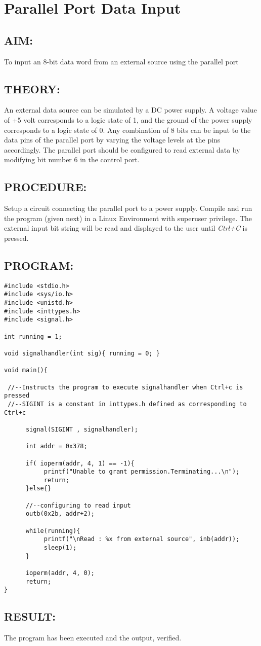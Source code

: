 
\chapter{Parallel Port Data Input}
%
%
\section*{AIM:}
To input an 8-bit data word from an external source using the parallel port
\section*{THEORY:}
An external data source can be simulated by a DC power supply. A voltage value of +5 volt corresponds to a logic state of 1, and the ground of the power supply corresponds to a logic state of 0. Any combination of 8
bits can be input to the data pins of the parallel port by varying the voltage levels at the pins accordingly. The parallel port should be configured to read external data by modifying bit number 6 in the control port.
\section*{PROCEDURE:}
Setup a circuit connecting the parallel port to a power supply. Compile and run the program (given next) in a Linux Environment with superuser privilege. The external input bit string will be read and displayed to the user until \emph{Ctrl+C} is pressed.
\section*{PROGRAM:}
\begin{lstlisting}
#include <stdio.h>
#include <sys/io.h>
#include <unistd.h>
#include <inttypes.h>
#include <signal.h>

int running = 1;

void signalhandler(int sig){ running = 0; }

void main(){

 //--Instructs the program to execute signalhandler when Ctrl+c is pressed
 //--SIGINT is a constant in inttypes.h defined as corresponding to Ctrl+c
 
      signal(SIGINT , signalhandler);
      
      int addr = 0x378;
      
      if( ioperm(addr, 4, 1) == -1){
           printf("Unable to grant permission.Terminating...\n");
           return;
      }else{}
      
      //--configuring to read input
      outb(0x2b, addr+2);
      
      while(running){
           printf("\nRead : %x from external source", inb(addr));
           sleep(1);
      }
      
      ioperm(addr, 4, 0);
      return;
}
\end{lstlisting}

\section*{RESULT:}
The program has been executed and the output, verified.
